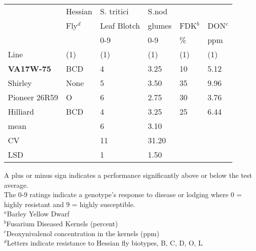 \documentclass[12pt, letterpaper]{article}
\begin{document}
\begin{landscape}
\begin{table}[h]
\bigskip 

\begin{tabular}{llllll}
\toprule
        & Hessian & S. tritici  & S.nod  &     &     \\ 
        & Fly$^d$     & Leaf Blotch & glumes & FDK$^b$ & DON$^c$ \\ 
        &         & 0-9         & 0-9    & \%  & ppm \\ 
Line  & (1) & (1) & (1) & (1) & (1) \\ 
\midrule
\textbf{VA17W-75} & BCD &  4 &  3.25 & 10 & 5.12 \\ 
Shirley & None &  5 &  3.50 & 35 & 9.96 \\ 
Pioneer 26R59 & O &  6 &  2.75 & 30 & 3.76 \\ 
Hilliard & BCD &  4 &  3.25 & 25 & 6.44 \\ 
\midrule
mean & &  6 &  3.10 &  &  \\ 
CV   & & 11 & 31.20 &  &  \\ 
LSD  & &  1 &  1.50 &  &  \\ 
\bottomrule
\end{tabular}

\raggedright{
\footnotesize
A plus or minus sign indicates a performance significantly above or below the test average.\\
The 0-9 ratings indicate a genotype's response to disease or lodging where 0 = highly resistant and 9 = highly susceptible.\\
$^a$Barley Yellow Dwarf \\
$^b$Fusarium Diseased Kernels (percent) \\
$^c$Deoxynivalenol concentration in the kernels (ppm)\\
$^d$Letters indicate resistance to Hessian fly biotypes, B, C, D, O, L} 

\end{table}



\newpage


\end{landscape}
\end{document}

